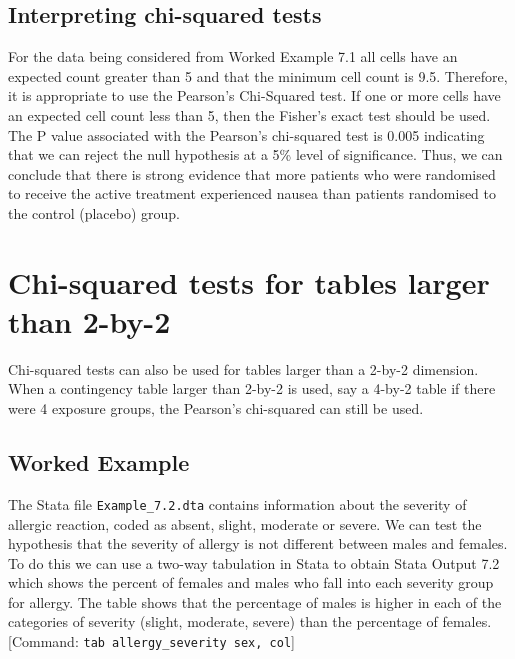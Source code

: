 \documentclass[
]{memoir}
\begin{document}
\hypertarget{interpreting-chi-squared-tests}{%
\subsection{Interpreting chi-squared tests}\label{interpreting-chi-squared-tests}}

For the data being considered from Worked Example 7.1 all cells have an expected count greater than 5 and that the minimum cell count is 9.5. Therefore, it is appropriate to use the Pearson's Chi-Squared test. If one or more cells have an expected cell count less than 5, then the Fisher's exact test should be used. The P value associated with the Pearson's chi-squared test is 0.005 indicating that we can reject the null hypothesis at a 5\% level of significance. Thus, we can conclude that there is strong evidence that more patients who were randomised to receive the active treatment experienced nausea than patients randomised to the control (placebo) group.

\hypertarget{chi-squared-tests-for-tables-larger-than-2-by-2}{%
\section{Chi-squared tests for tables larger than 2-by-2}\label{chi-squared-tests-for-tables-larger-than-2-by-2}}

Chi-squared tests can also be used for tables larger than a 2-by-2 dimension. When a contingency table larger than 2-by-2 is used, say a 4-by-2 table if there were 4 exposure groups, the Pearson's chi-squared can still be used.

\hypertarget{worked-example-10}{%
\subsection{Worked Example}\label{worked-example-10}}

The Stata file \texttt{Example\_7.2.dta} contains information about the severity of allergic reaction, coded as absent, slight, moderate or severe. We can test the hypothesis that the severity of allergy is not different between males and females. To do this we can use a two-way tabulation in Stata to obtain Stata Output 7.2 which shows the percent of females and males who fall into each severity group for allergy. The table shows that the percentage of males is higher in each of the categories of severity (slight, moderate, severe) than the percentage of females. {[}Command: \texttt{tab\ allergy\_severity\ sex,\ col}{]}
\end{document}
